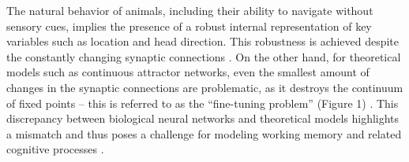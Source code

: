 \documentclass[12pt,letterpaper, onecolumn]{article}
\theoremstyle{definition}
\theoremstyle{remark}
\begin{document}
The natural behavior of animals, including their ability to navigate without sensory cues, implies the presence of a robust internal representation of key variables such as location and head direction.
This robustness is achieved despite the constantly changing synaptic connections \citep{shimizu2021}. %
On the other hand, for theoretical models such as continuous attractor networks, even the smallest amount of changes in the synaptic connections are problematic, as it destroys the continuum of fixed points -- this is referred to as the ``fine-tuning problem'' (Figure 1) \citep{seung1996, renart2003}.
This discrepancy between biological neural networks and theoretical models highlights a mismatch and thus poses a challenge for modeling working memory and related cognitive processes \citep{renart2003, seeholzer2019}. %
\end{document}
